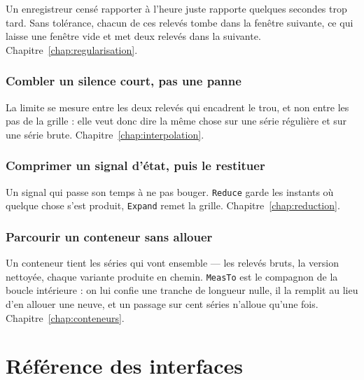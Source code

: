 Un enregistreur censé rapporter à l'heure juste rapporte quelques
secondes trop tard. Sans tolérance, chacun de ces relevés tombe dans la
fenêtre suivante, ce qui laisse une fenêtre vide et met deux relevés
dans la suivante. Chapitre~\ref{chap:regularisation}.



\subsection{Combler un silence court, pas une panne}

La limite se mesure entre les deux relevés qui encadrent le trou, et
non entre les pas de la grille : elle veut donc dire la même chose sur
une série régulière et sur une série brute.
Chapitre~\ref{chap:interpolation}.



\subsection{Comprimer un signal d'état, puis le restituer}

Un signal qui passe son temps à ne pas bouger. \texttt{Reduce} garde
les instants où quelque chose s'est produit, \texttt{Expand} remet la
grille. Chapitre~\ref{chap:reduction}.



\subsection{Parcourir un conteneur sans allouer}

Un conteneur tient les séries qui vont ensemble --- les relevés bruts,
la version nettoyée, chaque variante produite en chemin.
\texttt{MeasTo} est le compagnon de la boucle intérieure : on lui
confie une tranche de longueur nulle, il la remplit au lieu d'en
allouer une neuve, et un passage sur cent séries n'alloue qu'une fois.
Chapitre~\ref{chap:conteneurs}.



\chapter{Référence des interfaces}\label{chap:api}

